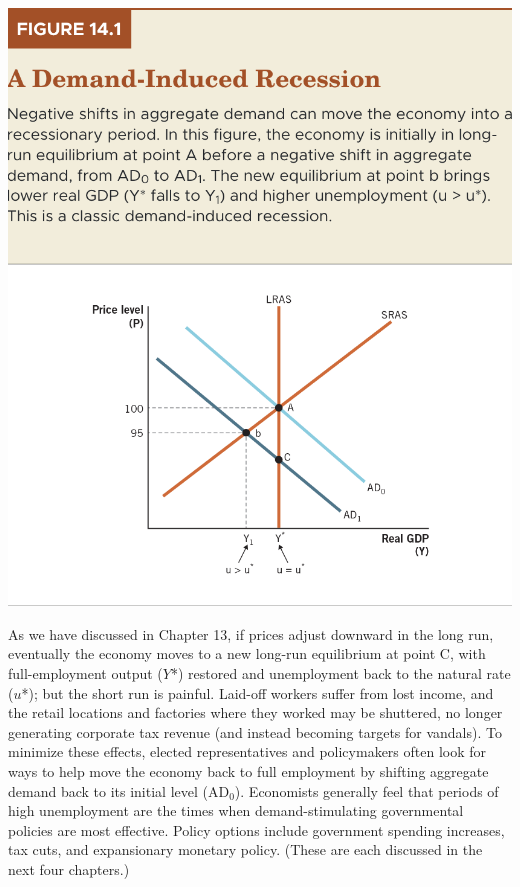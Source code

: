 \documentclass[11pt]{article} %
\begin{document}
\begin{center}
\includegraphics[scale=0.5]{images/Figure 14.1.png} 
\end{center}
As we have discussed in Chapter 13, if prices adjust downward in the long run, eventually the economy moves to a new long-run equilibrium at point C, with full-employment output (\(Y\)*) restored and unemployment back to the natural rate (\(u\)*); but the short run is painful. Laid-off workers suffer from lost income, and the retail locations and factories where they worked may be shuttered, no longer generating corporate tax revenue (and instead becoming targets for vandals). To minimize these effects, elected representatives and policymakers often look for ways to help move the economy back to full employment by shifting aggregate demand back to its initial level (\(\text{AD}_0\)). Economists generally feel that periods of high unemployment are the times when demand-stimulating governmental policies are most effective. Policy options include government spending increases, tax cuts, and expansionary monetary policy. (These are each discussed in the next four chapters.)
\end{document}
